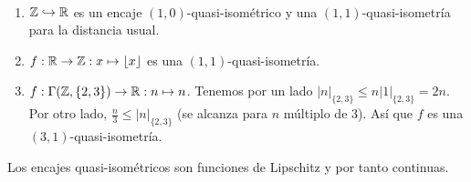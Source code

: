 \documentclass[twoside, 11pt]{article}
\begin{document}
\begin{ejs}\
\begin{enumerate}
\item $\mathbb{Z}\hookrightarrow\mathbb{R}$ es un encaje $(1,0)$-quasi-isométrico y una $(1,1)$-quasi-isometría para la distancia usual.
\item $f:\mathbb{R}\to\mathbb{Z}:x\mapsto\lfloor x\rfloor$ es una $(1,1)$-quasi-isometría.
\item $f:\Gamma(\mathbb{Z},\{2,3\})\to \mathbb{R}: n\mapsto n$. Tenemos por un lado $|n|_{\{2,3\}}\leq n|1|_{\{2,3\}}=2n$. Por otro lado, $\frac{n}{3}\leq |n|_{\{2,3\}}$ (se alcanza para $n$ múltiplo de 3). Así que $f$ es una $(3,1)$-quasi-isometría. 
\end{enumerate}
\end{ejs}

\begin{observacion}
Los encajes quasi-isométricos son funciones de Lipschitz y por tanto continuas.
\end{observacion}
\end{document}
